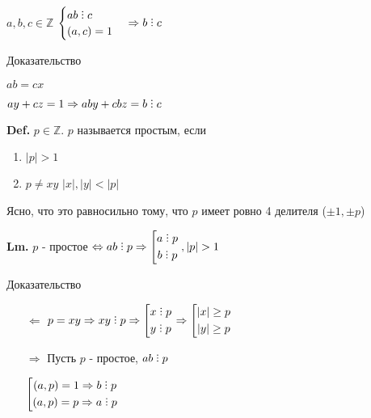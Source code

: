 \documentclass[14pt, letter paper]{article}
\DeclareRobustCommand{\divby}{%
  \mathrel{\text{\vbox{\baselineskip.65ex\lineskiplimit0pt\hbox{.}\hbox{.}\hbox{.}}}}%
}
\begin{document}
$a, b, c \in \mathds{Z}$ $\begin{cases} ab \divby c \\ (a, c) = 1 \end{cases} \Rightarrow b \divby c$

\begin{center}
    Доказательство
\end{center}

$ab = cx$

$ay + cz = 1 \Rightarrow aby + cbz = b \divby c$

\textbf{Def.} $p \in \mathds{Z}$. $p$ называется простым, если

\begin{enumerate}
    \item $|p| > 1$
    \item $p \neq xy$ $|x|, |y| < |p|$
\end{enumerate}

Ясно, что это равносильно тому, что $p$ имеет ровно 4 делителя ($\pm 1, \pm p$)

\textbf{Lm.} $p$ - простое $\Leftrightarrow ab \divby p \Rightarrow \left [ \begin{gathered} a \divby p \\ b \divby p \end{gathered} \right. , |p| > 1$

\begin{center}
    Доказательство
\end{center}

\begin{itemize}
    \item[$\Leftarrow$] $p = xy \Rightarrow xy \divby p \Rightarrow \left [ \begin{gathered} x \divby p \\ y \divby p \end{gathered} \right. \Rightarrow \left [ \begin{gathered} |x| \geq p \\ |y| \geq p \end{gathered} \right.$ 

    \item[$\Rightarrow$] Пусть $p$ - простое, $ab \divby p$

    $\left [ \begin{gathered} (a, p) = 1 \Rightarrow b \divby p\\ (a, p) = p \Rightarrow a \divby p\end{gathered} \right.$
\end{itemize}
\end{document}
